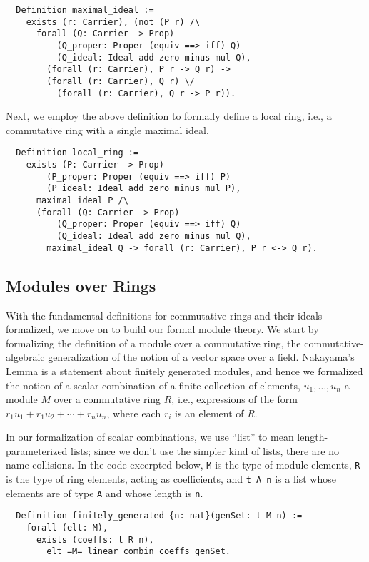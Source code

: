 \documentclass[referee,sn-mathphys]{sn-jnl}
\theoremstyle{definition}
\theoremstyle{remark}
\numberwithin{equation}{section}
\numberwithin{figure}{subsection}
\begin{document}
\begin{verbatim}
  Definition maximal_ideal :=
    exists (r: Carrier), (not (P r) /\
      forall (Q: Carrier -> Prop)
          (Q_proper: Proper (equiv ==> iff) Q)
          (Q_ideal: Ideal add zero minus mul Q),
        (forall (r: Carrier), P r -> Q r) ->
        (forall (r: Carrier), Q r) \/
          (forall (r: Carrier), Q r -> P r)).
\end{verbatim}

 Next, we employ the above definition to formally define a local
ring, i.e., a commutative ring with a single maximal ideal.
 
\begin{verbatim}
  Definition local_ring :=
    exists (P: Carrier -> Prop)
        (P_proper: Proper (equiv ==> iff) P)
        (P_ideal: Ideal add zero minus mul P),
      maximal_ideal P /\
      (forall (Q: Carrier -> Prop)
          (Q_proper: Proper (equiv ==> iff) Q)
          (Q_ideal: Ideal add zero minus mul Q),
        maximal_ideal Q -> forall (r: Carrier), P r <-> Q r).
\end{verbatim}

\subsection{Modules over Rings}
With the fundamental definitions for commutative rings and their ideals formalized, we move on 
to build our formal module theory.  
We start by formalizing the definition of a module over a commutative ring,
the commutative-algebraic generalization of the notion of a vector space over a
field. Nakayama's Lemma is a statement about finitely generated modules, and
hence we formalized the notion of a scalar combination of a finite
collection of elements, $u_1, \ldots, u_n$ a module $M$ over a commutative ring $R$, i.e.,
expressions of the form $r_1 u_1 + r_1 u_2 + \cdots + r_n u_n$, where each
$r_i$ is an element of $R$.

In our formalization of scalar combinations, we use  ``list'' to mean
length-parameterized lists; since we don't use the simpler kind of lists, there
are no name collisions. In the code excerpted below, \texttt{M} is the type of module elements,
\texttt{R} is the type of ring elements, acting as coefficients, and
\texttt{t A n} is a list whose elements are of type \texttt{A} and whose length
is \texttt{n}.

\begin{verbatim}
  Definition finitely_generated {n: nat}(genSet: t M n) :=
    forall (elt: M),
      exists (coeffs: t R n),
        elt =M= linear_combin coeffs genSet.
\end{verbatim}
\end{document}
